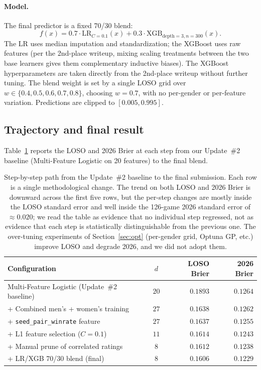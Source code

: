 \documentclass[11pt,a4paper]{article}
\theoremstyle{definition}
\begin{document}
\paragraph{Model.} The final predictor is a fixed 70/30 blend:
\[
f(x) = 0.7 \cdot \mathrm{LR}_{C=0.1}(x) + 0.3 \cdot \mathrm{XGB}_{\mathrm{depth}=3, n=300}(x).
\]
The LR uses median imputation and standardization; the XGBoost uses raw features (per the 2nd-place writeup, mixing scaling treatments between the two base learners gives them complementary inductive biases). The XGBoost hyperparameters are taken directly from the 2nd-place writeup without further tuning. The blend weight is set by a single LOSO grid over $w \in \{0.4, 0.5, 0.6, 0.7, 0.8\}$, choosing $w = 0.7$, with no per-gender or per-feature variation. Predictions are clipped to $[0.005, 0.995]$.

\subsection{Trajectory and final result}

Table~\ref{tab:trajectory} reports the LOSO and 2026 Brier at each step from our Update~\#2 baseline (Multi-Feature Logistic on 20 features) to the final blend.

\begin{table}[h]
\centering
\caption{Step-by-step path from the Update~\#2 baseline to the final submission. Each row is a single methodological change. The trend on both LOSO and 2026 Brier is downward across the first five rows, but the per-step changes are mostly inside the LOSO standard error and well inside the 126-game 2026 standard error of $\approx 0.020$; we read the table as evidence that no individual step regressed, not as evidence that each step is statistically distinguishable from the previous one. The over-tuning experiments of Section~\ref{sec:opt} (per-gender grid, Optuna GP, etc.) improve LOSO and degrade 2026, and we did not adopt them.}
\label{tab:trajectory}
\small
\begin{tabular}{@{}lcrr@{}}
\toprule
Configuration & $d$ & LOSO Brier & 2026 Brier \\
\midrule
Multi-Feature Logistic (Update~\#2 baseline) & $20$ & $0.1893$ & $0.1264$ \\
+ Combined men's + women's training & $27$ & $0.1638$ & $0.1262$ \\
+ \texttt{seed\_pair\_winrate} feature & $27$ & $0.1637$ & $0.1255$ \\
+ L1 feature selection ($C = 0.1$) & $11$ & $0.1614$ & $0.1243$ \\
+ Manual prune of correlated ratings & $8$ & $0.1612$ & $0.1238$ \\
+ LR/XGB 70/30 blend (final) & $8$ & $\mathbf{0.1606}$ & $\mathbf{0.1229}$ \\
\bottomrule
\end{tabular}
\end{table}
\end{document}
